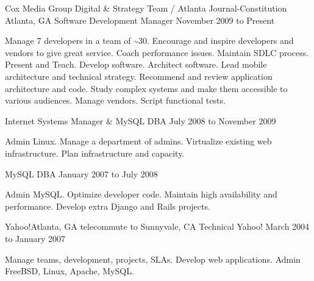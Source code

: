 \documentclass[10pt]{article}
\begin{document}




\sectionheader
{Cox Media Group Digital \& Strategy Team / Atlanta Journal-Constitution}
{Atlanta, GA}
{Software Development Manager}
{November 2009 to Present}
\begin{longtext}
Manage 7 developers in a team of \~{}30.
Encourage and inspire developers and vendors to give great service.
Coach performance issues.
Maintain SDLC process.
Present and Teach.
Develop software.
Architect software.
Lead mobile architecture and technical strategy.
Recommend and review application architecture and code.
Study complex systems and make them accessible to various audiences.
Manage vendors.
Script functional tests.

\end{longtext}
\sectionsub
{Internet Systems Manager \& MySQL DBA}
{July 2008 to November 2009}
\begin{longtext}
Admin Linux.
Manage a department of admins.
Virtualize existing web infrastructure.
Plan infrastructure and capacity.
\end{longtext}
\sectionsub
{MySQL DBA}
{January 2007 to July 2008}
\begin{longtext}
Admin MySQL.
Optimize developer code.
Maintain high availability and performance.
Develop extra Django and Rails projects.
\end{longtext}

\sectionheader
{Yahoo!}{Atlanta, GA telecommute to Sunnyvale, CA}
{Technical Yahoo!}
{March 2004 to January 2007}
\begin{longtext}
Manage teams, development, projects, SLAs.
Develop web applications.
Admin FreeBSD, Linux, Apache, MySQL.
\end{longtext}
\end{document}
